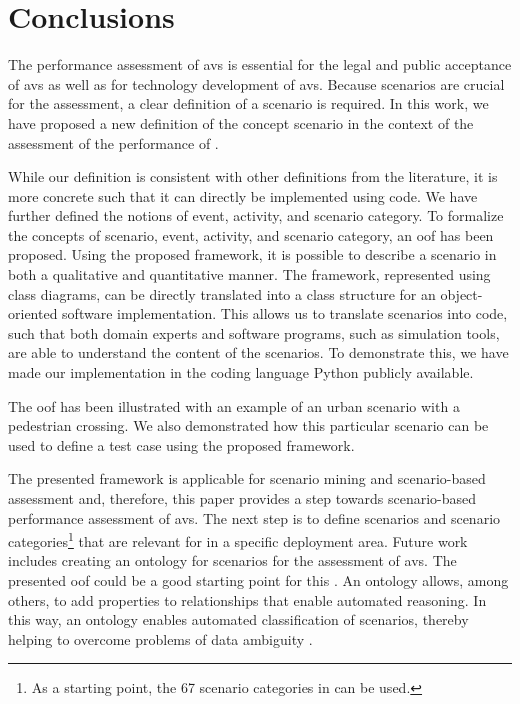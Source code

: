 \acresetall
\section{Conclusions}
\label{sec:conclusion}

The performance assessment of \acp{av} is essential for the legal and public acceptance of \acp{av} as well as for technology development of \acp{av}. 
Because scenarios are crucial for the assessment, a clear definition of a scenario is required.
In this work, we have proposed a new definition of the concept scenario in the context of the assessment of the performance of . 
 
While our definition is consistent with other definitions from the literature, it is more concrete such that it can directly be implemented using code.
We have further defined the notions of event, activity, and scenario category. 
To formalize the concepts of scenario, event, activity, and scenario category, an \cstartb \ac{oof} \cendb has been proposed. Using the proposed \cstartb framework\cendb, it is possible to describe a scenario in both a qualitative and quantitative manner. The \cstartb framework\cendb, represented using \cstartb class diagrams\cendb, can be directly translated into a class structure for an object-oriented software implementation. This allows us to translate scenarios into code, such that both domain experts and software programs, such as simulation tools, are able to understand the content of the scenarios. 
\cstartf To demonstrate this, we have made our implementation in the coding language Python publicly available. \cendf

The \cstartb \ac{oof} \cendb has been illustrated with an example of an urban scenario with a pedestrian crossing. 
We also demonstrated how this particular scenario can be used to define a test case using the proposed \cstartb framework\cendb.

The presented \cstartb framework \cendb is applicable for scenario mining \autocite{paardekooper2019dataset6000km, degelder2020scenariomining} and scenario-based assessment \autocite{elrofai2018scenario, putz2017pegasus} and, therefore, this paper provides a step towards scenario-based performance assessment of \acp{av}. The next step is to define scenarios and scenario categories\footnote{As a starting point, the 67 scenario categories in \autocite{degelder2019scenariocategories} can be used.} that are relevant for  in a specific deployment area. 
\cstartc Future work includes creating an ontology for scenarios for the assessment of \acp{av}. The presented \ac{oof} could be a good starting point for this \autocite{siricharoen2009ontology}. An ontology allows, among others, to add properties to relationships that enable automated reasoning. In this way, an ontology enables automated classification of scenarios, thereby helping to overcome problems of data ambiguity \autocite{OpenSCENARIO2}. \cendc

